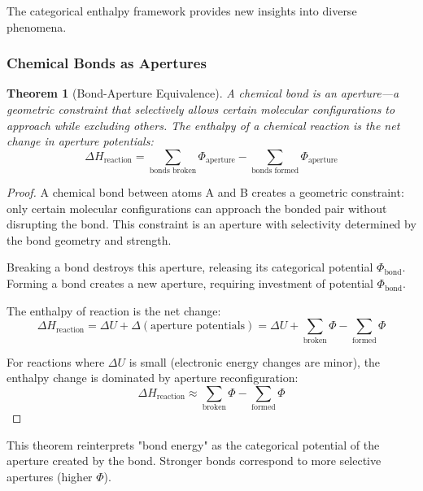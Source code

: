 \documentclass[12pt,a4paper]{article}
\newtheorem{theorem}{Theorem}[section]
\theoremstyle{definition}
\theoremstyle{remark}
\begin{document}
The categorical enthalpy framework provides new insights into diverse phenomena.

\subsubsection{Chemical Bonds as Apertures}

\begin{theorem}[Bond-Aperture Equivalence]
\label{thm:bond_aperture}
A chemical bond is an aperture—a geometric constraint that selectively allows certain molecular configurations to approach while excluding others. The enthalpy of a chemical reaction is the net change in aperture potentials:
\begin{equation}
\Delta H_{\text{reaction}} = \sum_{\text{bonds broken}} \Phi_{\text{aperture}} - \sum_{\text{bonds formed}} \Phi_{\text{aperture}}
\end{equation}
\end{theorem}

\begin{proof}
A chemical bond between atoms A and B creates a geometric constraint: only certain molecular configurations can approach the bonded pair without disrupting the bond. This constraint is an aperture with selectivity determined by the bond geometry and strength.

Breaking a bond destroys this aperture, releasing its categorical potential $\Phi_{\text{bond}}$. Forming a bond creates a new aperture, requiring investment of potential $\Phi_{\text{bond}}$.

The enthalpy of reaction is the net change:
\begin{equation}
\Delta H_{\text{reaction}} = \Delta U + \Delta(\text{aperture potentials}) = \Delta U + \sum_{\text{broken}} \Phi - \sum_{\text{formed}} \Phi
\end{equation}

For reactions where $\Delta U$ is small (electronic energy changes are minor), the enthalpy change is dominated by aperture reconfiguration:
\begin{equation}
\Delta H_{\text{reaction}} \approx \sum_{\text{broken}} \Phi - \sum_{\text{formed}} \Phi
\end{equation}
\end{proof}

This theorem reinterprets "bond energy" as the categorical potential of the aperture created by the bond. Stronger bonds correspond to more selective apertures (higher $\Phi$).
\end{document}
